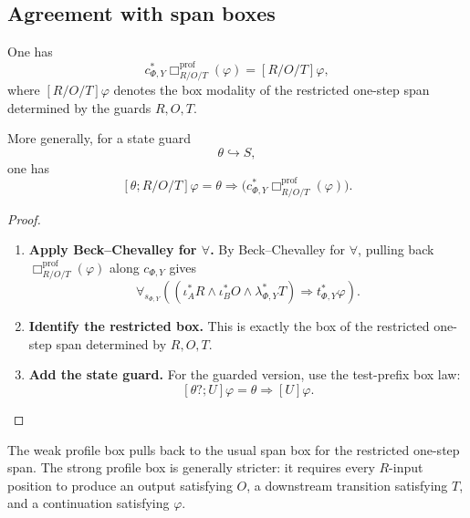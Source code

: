 \subsection{Agreement with span boxes}
\label{subsec:poly-relative-profile-box-span-agreement}

\begin{theorem}
\label{thm:poly-relative-profile-box-span-agreement}
One has
\[
c_{\Phi,Y}^{\ast}
\Box^{\mathrm{prof}}_{R/O/T}(\varphi)
=
[R/O/T]\varphi,
\]
where \([R/O/T]\varphi\) denotes the box modality of the restricted one-step
span determined by the guards \(R,O,T\).

More generally, for a state guard
\[
\theta\hookrightarrow S,
\]
one has
\[
[\theta;R/O/T]\varphi
=
\theta\Rightarrow
\bigl(
c_{\Phi,Y}^{\ast}
\Box^{\mathrm{prof}}_{R/O/T}(\varphi)
\bigr).
\]
\end{theorem}

\begin{proof}
\leavevmode
\begin{enumerate}
\item \textbf{Apply Beck--Chevalley for \(\forall\).}
By Beck--Chevalley for \(\forall\), pulling back
\(\Box^{\mathrm{prof}}_{R/O/T}(\varphi)\) along \(c_{\Phi,Y}\) gives
\[
\forall_{s_{\Phi,Y}}
\left(
(\iota_A^\ast R
\wedge
\iota_B^\ast O
\wedge
\lambda_{\Phi,Y}^\ast T)
\Rightarrow
t_{\Phi,Y}^\ast\varphi
\right).
\]

\item \textbf{Identify the restricted box.}
This is exactly the box of the restricted one-step span determined by
\(R,O,T\).

\item \textbf{Add the state guard.}
For the guarded version, use the test-prefix box law:
\[
[\theta?;U]\varphi
=
\theta\Rightarrow[U]\varphi.
\]
\end{enumerate}
\end{proof}

\begin{remark}
\label{rem:poly-relative-weak-strong-profile-boxes}
The weak profile box pulls back to the usual span box for the restricted
one-step span.  The strong profile box is generally stricter: it requires
every \(R\)-input position to produce an output satisfying \(O\), a downstream
transition satisfying \(T\), and a continuation satisfying \(\varphi\).
\end{remark}



